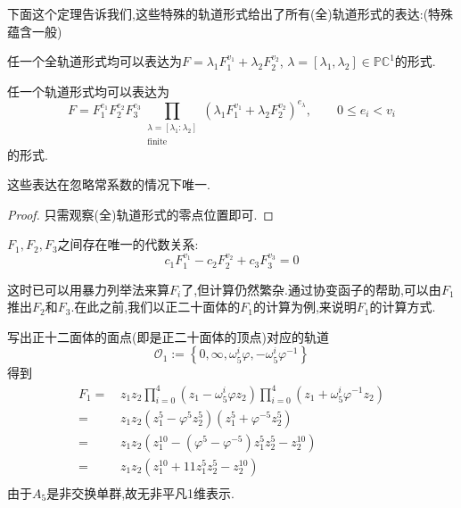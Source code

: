 下面这个定理告诉我们,这些特殊的轨道形式给出了所有(全)轨道形式的表达:(特殊蕴含一般)
\begin{theorem}\label{thm:expr} 任一个全轨道形式均可以表达为$F=\lambda_1F_1^{v_1}+\lambda_2F_2^{v_2}$, $\lambda=[\lambda_1,\lambda_2] \in \mathbb{PC}^1$的形式.
	
	任一个轨道形式均可以表达为
	$$F=F_1^{e_1}F_2^{e_2}F_3^{e_3}\prod_{\substack{\lambda=[\lambda_1:\lambda_2]\\\text{finite}}}(\lambda_1F_1^{v_1}+\lambda_2F_2^{v_2})^{e_{\lambda}},\qquad 0 \leqslant e_i < v_i$$
	的形式.
	
	这些表达在忽略常系数的情况下唯一.
\end{theorem}
\begin{proof}
	只需观察(全)轨道形式的零点位置即可.
\end{proof}
\begin{corollary}
	$F_1,F_2,F_3$之间存在唯一的代数关系:
	$$c_1F_1^{v_1}-c_2F_2^{v_2}+c_3F_3^{v_3}=0$$
\end{corollary}
这时已可以用暴力列举法来算$F_i$了,但计算仍然繁杂.通过协变函子的帮助,可以由$F_1$推出$F_2$和$F_3$.在此之前,我们以正二十面体的$F_1$的计算为例,来说明$F_1$的计算方式.
\begin{example1}[正二十面体的$F_1$]
	写出正十二面体的面点(即是正二十面体的顶点)对应的轨道
	$$\mathcal{O}_1:=\left\{0,\infty,\omega_5^i\varphi,-\omega_5^i\varphi^{-1} \right\}$$
	得到
	\begin{equation*}
	\begin{aligned}
	F_1 = \,& z_1z_2 \prod_{i=0}^{4}(z_1-\omega_5^i\varphi z_2) \prod_{i=0}^{4}(z_1+\omega_5^i\varphi^{-1} z_2) \\
	= \,& z_1z_2(z_1^5-\varphi^5 z_2^5)(z_1^5+\varphi^{-5}z_2^5)\\
	= \,& z_1z_2(z_1^{10}-(\varphi^5-\varphi^{-5})z_1^5z_2^5-z_2^{10})\\
	= \,& z_1z_2(z_1^{10}+11z_1^5z_2^5-z_2^{10})\\
	\end{aligned}
	\end{equation*}
	由于$A_5$是非交换单群,故无非平凡1维表示.
\end{example1}
